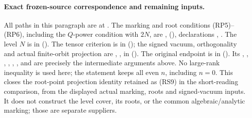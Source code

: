 \paragraph{Exact frozen-source correspondence and remaining inputs.}
All paths in this paragraph are at
.
The marking and root conditions (RP5)--(RP6), including the
\(Q\)-power condition with \(2N\), are
,
(), declarations , .
The level \(N\) is  in
().
The tensor criterion is  in
();
the signed vacuum, orthogonality and actual finite-orbit projection are
, ,
 in
().
The original endpoint is  in
().
Its , ,
, , ,
,  and
 are precisely the intermediate arguments
above. No large-rank inequality is used here; the statement keeps
all even \(n\), including \(n=0\).
This closes the root-point projection identity retained as (RS9)
in the short-reading comparison, from the displayed actual
marking, roots and signed-vacuum inputs. It does not construct
the level cover, its roots, or the common algebraic/analytic
marking; those are separate suppliers.

